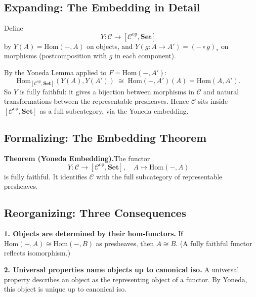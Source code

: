 \subsection{Expanding: The Embedding in Detail}

Define
\begin{equation*}
  \mathit{Y} : \mathcal{C} \to [\mathcal{C}^{\mathrm{op}}, \mathbf{Set}]
\end{equation*}
by $\mathit{Y}(A) = \mathrm{Hom}(-, A)$ on objects, and
$\mathit{Y}(g : A \to A') = (- \circ g)_*$ on morphisms (postcomposition
with $g$ in each component).

By the Yoneda Lemma applied to $F = \mathrm{Hom}(-, A')$:
\begin{equation*}
  \mathrm{Hom}_{[\mathcal{C}^{\mathrm{op}}, \mathbf{Set}]}(\mathit{Y}(A), \mathit{Y}(A'))
  \;\cong\; \mathrm{Hom}(-, A')(A) = \mathrm{Hom}(A, A').
\end{equation*}
So $\mathit{Y}$ is fully faithful: it gives a bijection between morphisms
in $\mathcal{C}$ and natural transformations between the representable
presheaves. Hence $\mathcal{C}$ sits inside
$[\mathcal{C}^{\mathrm{op}}, \mathbf{Set}]$ as a full subcategory, via the
Yoneda embedding.

\subsection{Formalizing: The Embedding Theorem}

\textbf{Theorem (Yoneda Embedding).}\quad The functor
\begin{equation*}
  \mathit{Y} : \mathcal{C} \to [\mathcal{C}^{\mathrm{op}}, \mathbf{Set}],
  \quad
  A \mapsto \mathrm{Hom}(-, A)
\end{equation*}
is fully faithful. It identifies $\mathcal{C}$ with the full subcategory
of representable presheaves.

\subsection{Reorganizing: Three Consequences}

\textbf{1. Objects are determined by their hom-functors.}\quad
If $\mathrm{Hom}(-, A) \cong \mathrm{Hom}(-, B)$ as presheaves, then
$A \cong B$. (A fully faithful functor reflects isomorphism.)

\textbf{2. Universal properties name objects up to canonical iso.}\quad
A universal property describes an object as the representing object of a
functor. By Yoneda, this object is unique up to canonical iso.


